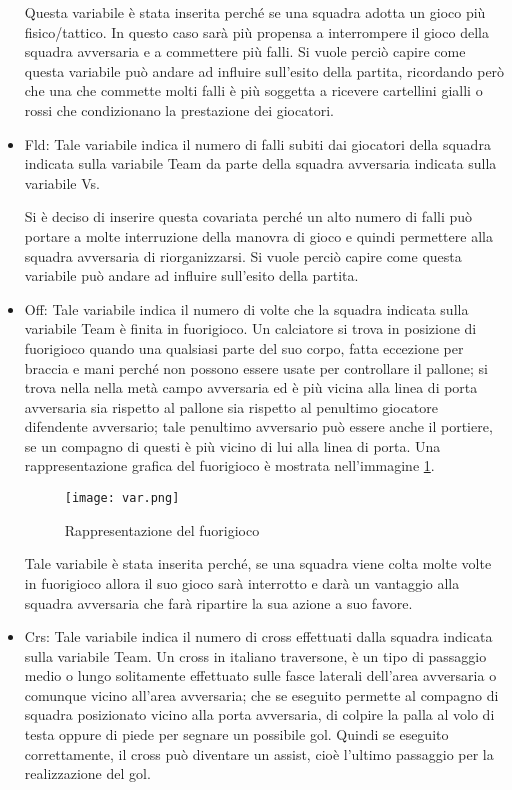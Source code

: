 \begin{itemize}
	Questa variabile è stata inserita perché se una squadra adotta un gioco più fisico/tattico. In questo caso sarà più propensa a interrompere il gioco della squadra avversaria e a commettere più falli. Si vuole perciò capire come questa variabile può andare ad influire sull'esito della partita, ricordando però che una che commette molti falli è più soggetta a ricevere cartellini gialli o rossi che condizionano la prestazione dei giocatori.
	\item \textsf{Fld}: Tale variabile indica il numero di falli subiti dai giocatori della squadra indicata sulla variabile \textsf{Team} da parte della squadra avversaria indicata sulla variabile \textsf{Vs}. 
	
	Si è deciso di inserire questa covariata perché un alto numero di falli può portare a molte interruzione della manovra di gioco e quindi permettere alla squadra avversaria di riorganizzarsi. Si vuole perciò capire come questa variabile può andare ad influire sull'esito della partita.
	\item \textsf{Off}: Tale variabile indica il numero di volte che la squadra indicata sulla variabile \textsf{Team} è finita in fuorigioco. Un calciatore si trova in posizione di fuorigioco quando una qualsiasi parte del suo corpo, fatta eccezione per braccia e mani perché non possono essere usate per controllare il pallone; si trova nella nella metà campo avversaria ed è più vicina alla linea di porta avversaria sia rispetto al pallone sia rispetto al penultimo giocatore difendente avversario; tale penultimo avversario può essere anche il portiere, se un compagno di questi è più vicino di lui alla linea di porta. Una rappresentazione grafica del fuorigioco è mostrata nell'immagine \ref{fig:offside}.
	
	\begin{figure}[!h]
		\begin{center}
			\texttt{[image: var.png]}
			\caption{Rappresentazione del fuorigioco} \label{fig:offside}
		\end{center}
	\end{figure}

	Tale variabile è stata inserita perché, se una squadra viene colta molte volte in fuorigioco allora il suo gioco sarà interrotto e darà un vantaggio alla squadra avversaria che farà ripartire la sua azione a suo favore.
	
	
	\item \textsf{Crs}: Tale variabile indica il numero di cross effettuati dalla squadra indicata sulla variabile \textsf{Team}. Un cross in italiano traversone, è un tipo di passaggio medio o lungo solitamente effettuato sulle fasce laterali dell'area avversaria o comunque vicino all'area avversaria; che se eseguito permette al compagno di squadra posizionato vicino alla porta avversaria, di colpire la palla al volo di testa oppure di piede per segnare un possibile gol. Quindi se eseguito correttamente, il cross può diventare un assist, cioè l'ultimo passaggio per la realizzazione del gol. 
	

\end{itemize}
